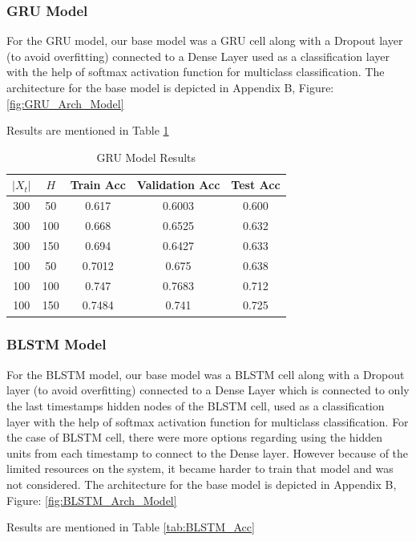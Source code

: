 \documentclass[letterpaper, 12 pt, conference]{ieeeconf}  %
\begin{document}
\subsubsection{GRU Model}
For the GRU model, our base model was a GRU cell along with a Dropout layer (to avoid overfitting) connected to a Dense Layer used as a classification layer with the help of softmax activation function for multiclass classification. The architecture for the base model is depicted in Appendix B, Figure: \ref{fig:GRU_Arch_Model}

Results are mentioned in Table \ref{tab:GRU_Acc}

\begin{table}[!h]
\centering
\caption{GRU Model Results}
\begin{tabular}{| c || c || c || c || c |} %
\hline %
 $|X_t|$ & $H$ & Train Acc & Validation Acc & Test Acc\\
   \hline \hline
300 & 50 & 0.617 & 0.6003 & 0.600 \\
\hline
300 & 100 & 0.668 & 0.6525 & 0.632 \\
\hline
300 & 150 & 0.694 & 0.6427 & 0.633 \\	
\hline
100 & 50 & 0.7012 & 0.675 & 0.638 \\
\hline
100 & 100 & 0.747 & 0.7683 & 0.712 \\
\hline
100 & 150 & 0.7484 & 0.741 & 0.725 \\
\hline
   \end{tabular}
\label{tab:GRU_Acc} 
\end{table}


\subsubsection{BLSTM Model}
For the BLSTM model, our base model was a BLSTM cell along with a Dropout layer (to avoid overfitting) connected to a Dense Layer which is connected to only the last timestamps hidden nodes of the BLSTM cell, used as a classification layer with the help of softmax activation function for multiclass classification. For the case of BLSTM cell, there were more options regarding using the hidden units from each timestamp to connect to the Dense layer. However because of the limited resources on the system, it became harder to train that model and was not considered. The architecture for the base model is depicted in Appendix B, Figure: \ref{fig:BLSTM_Arch_Model}

Results are mentioned in Table \ref{tab:BLSTM_Acc}
\end{document}
